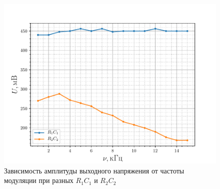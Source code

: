 \begin{figure}[H]
	\centering
	\includegraphics[width=\linewidth]{fig/exp3b.pdf}
	\caption{Зависимость амплитуды выходного напряжения от частоты модуляции при разных $R_1C_1$ и $R_2C_2$  }
	\label{exp:3.3}
\end{figure}



